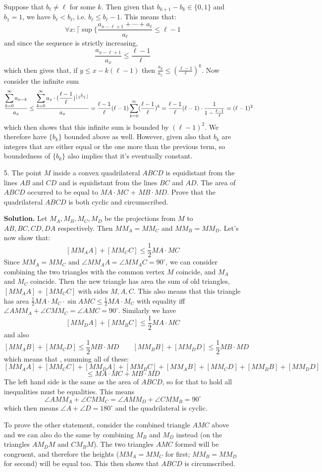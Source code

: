 \documentclass[11pt,a4paper]{article}
\begin{document}
\begin{enumerate}
	Suppose that $b_\ell\neq \ell$ for some $k$. Then given that $b_{k+1}-b_k\in \{0, 1\}$ and $b_1 = 1$, we have $b_\ell < b_\ell $, i.e. $b_{\ell}\le b_\ell - 1$. This means that: 
	\[
	\forall x: \lceil\sup\{\frac{a_{x-\ell+1}+\cdots + a_\ell}{a_\ell}\le \ell - 1
	\]
	and since the sequence is strictly increasing, 
	\[
	\frac{a_{x - \ell + 1}}{a_x}\le \frac{\ell - 1}{\ell}
	\]
	which then gives that, if $y\le x - k(\ell - 1)$ then $\frac{a_y}{a_x}\le (\frac{\ell-1}{\ell})^k$. 
	Now consider the infinite sum 
	\[
	\frac{\displaystyle\sum_{k=0}^{\infty}a_{x-k}}{a_x}\le \frac{\displaystyle\sum_{k=0}^{\infty}a_x\cdot (\frac{\ell-1}{\ell})^{\lfloor \frac{k}{\ell-1}\rfloor}}{a_x} = \frac{\ell-1}{\ell}(\ell-1)\displaystyle\sum_{k=0}^{\infty}(\frac{\ell-1}{\ell})^{k}
	= \frac{\ell-1}{\ell}(\ell-1)\cdot \frac{1}{1-\frac{\ell-1}{\ell}}=(\ell-1)^2
	\]
	which then shows that this infinite sum is bounded by $(\ell-1)^2$. We therefore have $\{b_k\}$ bounded above as well. However, given also that $b_k$ are integers that are either equal or the one more than the previous term, so boundedness of $\{b_k\}$ also implies that it's eventually constant. 
	
	\item [5.] The point $M$ inside a convex quadrilateral $ABCD$ is equidistant from the lines $AB$ and $CD$ and is equidistant from the lines $BC$ and $AD$. The area of $ABCD$ occurred to be equal to $MA\cdot MC$ + $MB \cdot MD$. Prove that the quadrilateral $ABCD$ is both cyclic and circumscribed. 
	
	\textbf{Solution.} Let $M_A, M_B, M_C, M_D$ be the projections from $M$ to $AB, BC, CD, DA$ respectively. Then $MM_A=MM_C$ and $MM_B=MM_D$. Let's now show that: 
	\[
	[MM_AA]+[MM_CC]\le \frac 12 MA\cdot MC
	\]
	Since $MM_A=MM_C$ and $\angle MM_AA=\angle MM_AC = 90^{\circ}$, we can consider combining the two triangles with the common vertex $M$ coincide, and $M_A$ and $M_C$ coincide. Then the new triangle has area the sum of old triangles, $[MM_AA]+[MM_CC]$ with sides $M, A, C$. This also means that this triangle has area $\frac 12 MA\cdot M_C\cdot \sin AMC\le \frac 12 MA\cdot M_C$ with equality iff $\angle AMM_A+\angle CMM_C=\angle AMC=90^{\circ}$. Similarly we have 
	\[
	[MM_DA]+[MM_BC]\le \frac 12 MA\cdot MC
	\]
	and also 
	\[
	[MM_AB]+[MM_CD]\le \frac 12 MB\cdot MD
	\qquad 
	[MM_BB]+[MM_DD]\le \frac 12 MB\cdot MD
	\]
	which means that , summing all of these:
	\[
	[MM_AA]+[MM_CC]+[MM_DA]+[MM_BC]+[MM_AB]+[MM_CD]+[MM_BB]+[MM_DD]\]\[\le MA\cdot MC + MB\cdot MD
	\]
	The left hand side is the same as the area of $ABCD$, so for that to hold all inequalities must be equalities. 
	This means 
	\[\angle AMM_A+\angle CMM_C=\angle AMM_D+\angle CMM_B=90^{\circ}
	\]
	which then means $\angle A+\angle D=180^{\circ}$ and the quadrilateral is cyclic. 
	
	To prove the other statement, consider the combined triangle $AMC$ above and we can also do the same by combining $M_B$ and $M_D$ instead (on the triangles $AM_DM$ and $CM_BM$). The two triangles $AMC$ formed will be congruent, and therefore the heights ($MM_A=MM_C$ for first; $MM_B=MM_D$ for second) will be equal too. This then shows that $ABCD$ is circumscribed. 
	
		
\end{enumerate}
\end{document}
